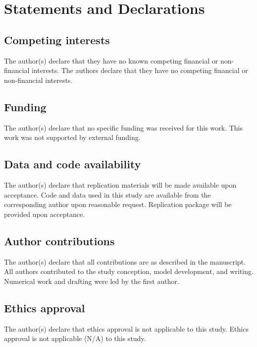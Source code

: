 
\section*{Statements and Declarations}

\subsection*{Competing interests}
\ifjeicblind
The author(s) declare that they have no known competing financial or non-financial interests.
\else
The authors declare that they have no competing financial or non-financial interests.
\fi

\subsection*{Funding}
\ifjeicblind
The author(s) declare that no specific funding was received for this work.
\else
This work was not supported by external funding.
\fi

\subsection*{Data and code availability}
\ifjeicblind
The author(s) declare that replication materials will be made available upon acceptance.
\else
Code and data used in this study are available from the corresponding author upon reasonable request. Replication package will be provided upon acceptance.
\fi

\subsection*{Author contributions}
\ifjeicblind
The author(s) declare that all contributions are as described in the manuscript.
\else
All authors contributed to the study conception, model development, and writing. Numerical work and drafting were led by the first author.
\fi

\subsection*{Ethics approval}
\ifjeicblind
The author(s) declare that ethics approval is not applicable to this study.
\else
Ethics approval is not applicable (N/A) to this study.
\fi
